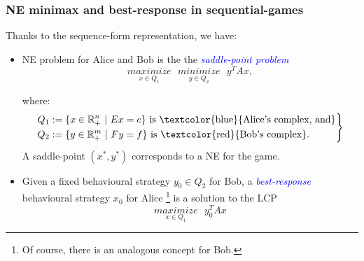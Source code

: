 \documentclass[xcolor=dvipsnames]{beamer}
\begin{document}
\begin{frame}
  \frametitle{NE minimax and best-response in sequential-games}
Thanks to the sequence-form representation, we have:
\begin{itemize}[<+->]
\item NE problem for Alice and Bob is the the \textit{\textcolor{blue}{saddle-point problem}}
  \begin{equation}
    \underset{x \in Q_1}{maximize}\text{ }\underset{y \in Q_2}{minimize}\text{ }y^TAx,
    \label{eq:minimax_stengel}
  \end{equation}
  
    where:
   \begin{equation}
     \left .
     \begin{split}
       Q_1 &:= \{x \in \mathbb{R}_+^n\text{ }|\text{ }Ex=e\} \text{ is \textcolor{blue}{Alice's complex, and}}\\
       Q_2 &:= \{y \in \mathbb{R}_+^m\text{ }|\text{ }Fy=f\} \text{ is \textcolor{red}{Bob's complex}.}
     \end{split}
      \right\}
   \end{equation}
   A saddle-point $(x^*, y^*)$ corresponds to a NE for the game.
   \item Given a fixed behavioural strategy $y_0 \in Q_2$ for Bob, a \textit{\textcolor{blue}{best-response}} behavioural strategy $x_0$ for Alice
     \footnote{Of course, there is an analogous concept for Bob.}
    is a solution to the LCP
    \begin{equation}
      \underset{x\in Q_1}{maximize}\text{ }{y_0^TAx}
    \end{equation}
  \end{itemize}
\end{frame}
    
\end{document}
